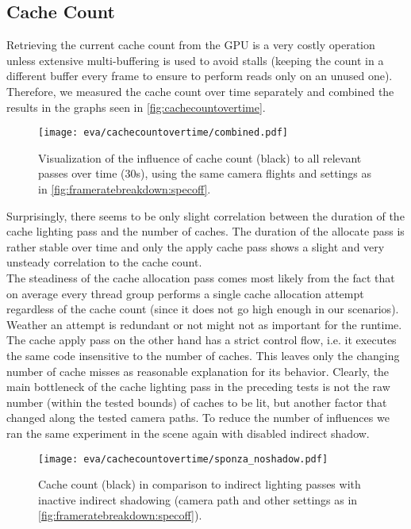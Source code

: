 \documentclass[thesis.tex]{subfiles}
\begin{document}
\subsection{Cache Count}
Retrieving the current cache count from the GPU is a very costly operation unless extensive multi-buffering is used to avoid stalls (keeping the count in a different buffer every frame to ensure to perform reads only on an unused one).
Therefore, we measured the cache count over time separately and combined the results in the graphs seen in \autoref{fig:cachecountovertime}.

\begin{figure}
\centering
\texttt{[image: eva/cachecountovertime/combined.pdf]}
\caption{Visualization of the influence of cache count (black) to all relevant passes over time (30s), using the same camera flights and settings as in \autoref{fig:frameratebreakdown:specoff}.}
\label{fig:cachecountovertime}
\end{figure}

Surprisingly, there seems to be only slight correlation between the duration of the cache lighting pass and the number of caches.
The duration of the allocate pass is rather stable over time and only the apply cache pass shows a slight and very unsteady correlation to the cache count.
\\
The steadiness of the cache allocation pass comes most likely from the fact that on average every thread group performs a single cache allocation attempt regardless of the cache count (since it does not go high enough in our scenarios).
Weather an attempt is redundant or not might not as important for the runtime.
The cache apply pass on the other hand has a strict control flow, i.e. it executes the same code insensitive to the number of caches.
This leaves only the changing number of cache misses as reasonable explanation for its behavior.
Clearly, the main bottleneck of the cache lighting pass in the preceding tests is not the raw number (within the tested bounds) of caches to be lit, but another factor that changed along the tested camera paths.
To reduce the number of influences we ran the same experiment in the  scene again with disabled indirect shadow.

\begin{figure}
\centering
\texttt{[image: eva/cachecountovertime/sponza\_noshadow.pdf]}
\caption{Cache count (black) in comparison to indirect lighting passes with inactive indirect shadowing (camera path and other settings as in \autoref{fig:frameratebreakdown:specoff}).}
\label{fig:cachecountovertime:noshadow}
\end{figure}
\end{document}

